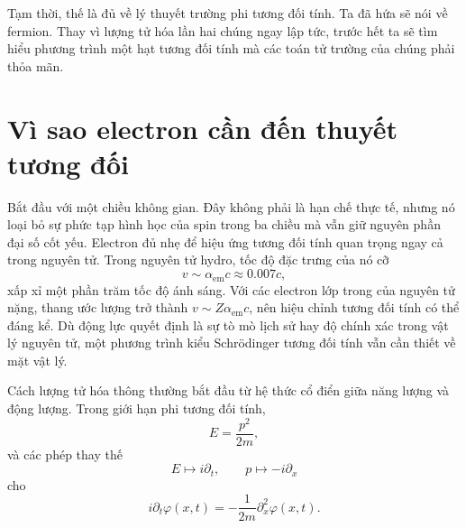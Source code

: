 \begin{classroomqa}\end{classroomqa}

\begin{classroomqa}\end{classroomqa}

Tạm thời, thế là đủ về lý thuyết trường phi tương đối tính. Ta đã hứa sẽ nói về fermion. Thay vì lượng tử hóa lần hai chúng ngay lập tức, trước hết ta sẽ tìm hiểu phương trình một hạt tương đối tính mà các toán tử trường của chúng phải thỏa mãn.

\section{Vì sao electron cần đến thuyết tương đối}

Bắt đầu với một chiều không gian. Đây không phải là hạn chế thực tế, nhưng nó loại bỏ sự phức tạp hình học của spin trong ba chiều mà vẫn giữ nguyên phần đại số cốt yếu. Electron đủ nhẹ để hiệu ứng tương đối tính quan trọng ngay cả trong nguyên tử. Trong nguyên tử hydro, tốc độ đặc trưng của nó cỡ
\begin{equation}
v\sim\alpha_{\mathrm{em}}c\approx 0.007c,
\end{equation}
xấp xỉ một phần trăm tốc độ ánh sáng. Với các electron lớp trong của nguyên tử nặng, thang ước lượng trở thành \(v\sim Z\alpha_{\mathrm{em}}c\), nên hiệu chỉnh tương đối tính có thể đáng kể. Dù động lực quyết định là sự tò mò lịch sử hay độ chính xác trong vật lý nguyên tử, một phương trình kiểu Schr\"odinger tương đối tính vẫn cần thiết về mặt vật lý.

Cách lượng tử hóa thông thường bắt đầu từ hệ thức cổ điển giữa năng lượng và động lượng. Trong giới hạn phi tương đối tính,
\begin{equation}
E=\frac{p^2}{2m},
\end{equation}
và các phép thay thế
\begin{equation}
E\mapsto i\partial_t,
\qquad
p\mapsto-i\partial_x
\end{equation}
cho
\begin{equation}
i\partial_t\varphi(x,t)
=-\frac{1}{2m}\partial_x^2\varphi(x,t).
\end{equation}


